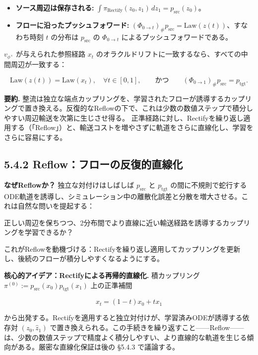 \begin{itemize}
\item \textbf{ソース周辺は保存される:} $\displaystyle\int \pi_{\mathrm{Rectify}}(z_0, z_1)\, dz_1 = p_{\mathrm{src}}(z_0)$。
\item \textbf{フローに沿ったプッシュフォワード:} $(\Phi_{0\to t})_{\#} p_{\mathrm{src}} = \mathrm{Law}(z(t))$、すなわち時刻 $t$ の分布は $p_{\mathrm{src}}$ の $\Phi_{0\to t}$ によるプッシュフォワードである。
\end{itemize}


$v_{\phi^\times}$ が与えられた参照経路 $x_t$ のオラクルドリフトに一致するなら、すべての中間周辺が一致する：

\[
\mathrm{Law}(z(t)) = \mathrm{Law}(x_t), \quad \forall t\in[0,1], \qquad\text{かつ}\qquad (\Phi_{0\to 1})_{\#} p_{\mathrm{src}} = p_{\mathrm{tgt}}.
\]


\textbf{要約.} 整流は独立な端点カップリングを、学習されたフローが誘導するカップリングで置き換える。反復的なReflowの下で、これは少数の数値ステップで積分しやすい周辺輸送を次第に生じさせ得る。
正準経路に対し、Rectifyを繰り返し適用する（「Reflow」）と、輸送コストを増やさずに軌道をさらに直線化し、学習をさらに容易にする。

\subsection*{5.4.2 Reflow：フローの反復的直線化}


\textbf{なぜReflowか？} 独立な対付けはしばしば $p_{\mathrm{src}}$ と $p_{\mathrm{tgt}}$ の間に不規則で蛇行するODE軌道を誘導し、シミュレーション中の離散化誤差と分散を増大させる。これは自然な問いを提起する：

\begin{propositionbox}[問い 5.4.1]
正しい周辺を保ちつつ、2分布間でより直線に近い輸送経路を誘導するカップリングを学習できるか？
\end{propositionbox}


これがReflowを動機づける：Rectifyを繰り返し適用してカップリングを更新し、後続のフローが積分しやすくなるようにする。

\textbf{核心的アイデア：Rectifyによる再帰的直線化.} 積カップリング $\pi^{(0)} := p_{\mathrm{src}}(x_0)p_{\mathrm{tgt}}(x_1)$ 上の正準補間

\[
x_t = (1-t)x_0 + t x_1
\]


から出発する。Rectifyを適用すると独立対付けが、学習済みODEが誘導する依存対 $(z_0, \hat{z}_1)$ で置き換えられる。この手続きを繰り返すこと——Reflow——は、少数の数値ステップで精度よく積分しやすい、より直線的な軌道を生じる傾向がある。厳密な直線化保証は後の §5.4.3 で議論する。

